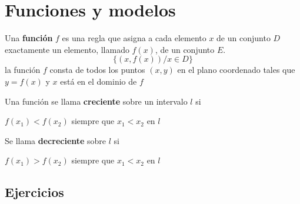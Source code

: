 \chapter{Funciones y modelos}
\begin{tcolorbox}[colframe=white]
    \begin{def.}
	Una \textbf{función} $f$ es una regla que asigna a cada elemento $x$ de un conjunto $D$ exactamente un elemento, llamado $f(x)$, de un conjunto $E$.
	$$\lbrace (x,f(x)) / x \in D \rbrace$$
	la función $f$ consta de todos los puntos $(x,y)$ en el plano coordenado tales que $y=f(x)$ y $x$ está en el dominio de $f$
    \end{def.}
\end{tcolorbox}

\begin{tcolorbox}[colframe=white]
    \begin{def.}
	Una función se llama \textbf{creciente} sobre un intervalo $l$ si
	\begin{center}
	    $f(x_1)<f(x_2)$ siempre que $x_1<x_2$ en $l$
	\end{center}
	Se llama \textbf{decreciente} sobre $l$ si
	\begin{center}
	    $f(x_1)>f(x_2)$ siempre que $x_1< x_2$ en $l$
	\end{center}
    \end{def.}
\end{tcolorbox}

\section{Ejercicios}
    
